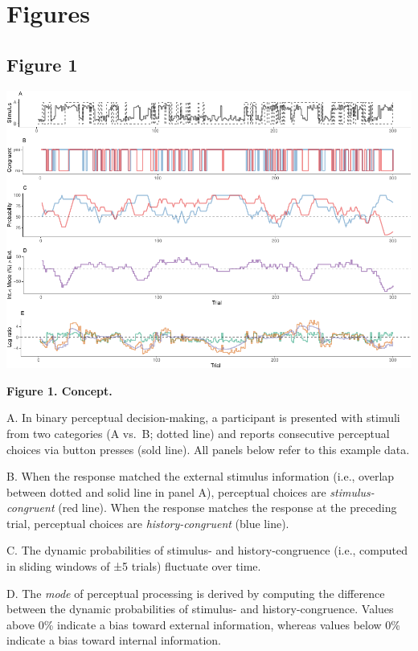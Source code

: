\documentclass[
]{article}
\begin{document}
\hypertarget{figures}{%
\section{Figures}\label{figures}}

\hypertarget{figure-1}{%
\subsection{Figure 1}\label{figure-1}}

\includegraphics{modes_mouse_files/figure-latex/Figure_1-1.pdf}

\textbf{Figure 1. Concept.}

A. In binary perceptual decision-making, a participant is presented with
stimuli from two categories (A vs.~B; dotted line) and reports
consecutive perceptual choices via button presses (sold line). All
panels below refer to this example data.

B. When the response matched the external stimulus information (i.e.,
overlap between dotted and solid line in panel A), perceptual choices
are \emph{stimulus-congruent} (red line). When the response matches the
response at the preceding trial, perceptual choices are
\emph{history-congruent} (blue line).

C. The dynamic probabilities of stimulus- and history-congruence (i.e.,
computed in sliding windows of ±5 trials) fluctuate over time.

D. The \emph{mode} of perceptual processing is derived by computing the
difference between the dynamic probabilities of stimulus- and
history-congruence. Values above 0\% indicate a bias toward external
information, whereas values below 0\% indicate a bias toward internal
information.
\end{document}
